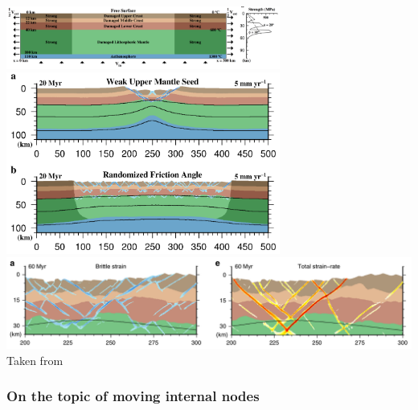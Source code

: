 \begin{center}
\includegraphics[width=9cm]{images/freesurface/nabp17a}\\
\includegraphics[width=9cm]{images/freesurface/nabp17b}\\
\includegraphics[width=14cm]{images/freesurface/nabp17c}\\
{\captionfont Taken from \cite{nabp17}}
\end{center}

\subsubsection{On the topic of moving internal nodes}


